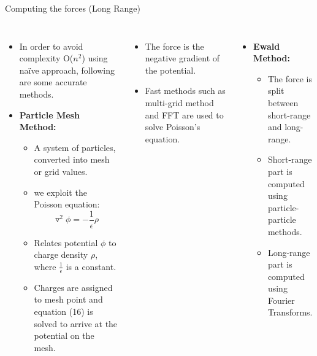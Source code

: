 \documentclass[aspectratio=169]{beamer}
\begin{document}
\begin{frame}[fragile]{Computing the forces (Long Range)}
\begin{columns}

\begin{itemize}
\item In order to avoid complexity O($n^2$) using naïve approach, following are some accurate methods.
\item \textbf{Particle Mesh Method:}
\begin{itemize}
\item A system of particles, converted into mesh or grid values.
\item we exploit the Poisson equation:
\begin{equation}
\triangledown^2\phi = - \frac{1}{\epsilon}\rho
\end{equation}
\item Relates potential $\phi$ to charge density $\rho$, where $\frac{1}{\epsilon}$ is a constant.
\item Charges are assigned to mesh point and equation (16) is solved to arrive at the potential on the mesh.
\end{itemize}
\end{itemize}

\begin{itemize}
\item The force is the negative gradient of the potential.
\item Fast methods such as multi-grid method and FFT are used to solve Poisson’s equation.
\end{itemize}
\begin{itemize}
\item \textbf{Ewald Method:}
\begin{itemize}
\item The force is split between short-range and long-range.
\item Short-range part is computed using particle-particle methods.
\item Long-range part is computed using Fourier Transforms.
\end{itemize}
\end{itemize}
\end{columns}
\end{frame}
\end{document}
